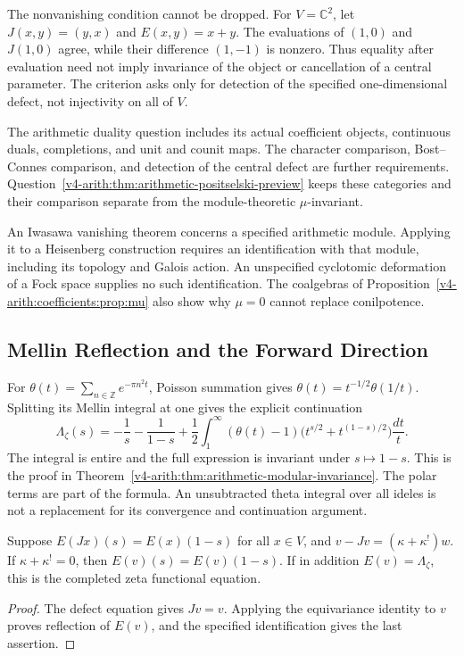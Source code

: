 The nonvanishing condition cannot be dropped. For
\(V=\mathbb C^2\), let \(J(x,y)=(y,x)\) and \(E(x,y)=x+y\).
The evaluations of \((1,0)\) and \(J(1,0)\) agree, while their
difference \((1,-1)\) is nonzero. Thus equality after evaluation
need not imply invariance of the object or cancellation of a central
parameter. The criterion asks only for detection of the specified
one-dimensional defect, not injectivity on all of \(V\).

\begin{remark}
\label{v4-arith:cl:rem:P1-conditional}
The arithmetic duality question includes its actual coefficient
objects, continuous duals, completions, and unit and counit maps.
The character comparison, Bost--Connes comparison, and detection of
the central defect are further requirements.
Question~\ref{v4-arith:thm:arithmetic-positselski-preview} keeps
these categories and their comparison separate from the
module-theoretic \(\mu\)-invariant.

An Iwasawa vanishing theorem concerns a specified arithmetic module.
Applying it to a Heisenberg construction requires an identification
with that module, including its topology and Galois action.
An unspecified cyclotomic deformation of a Fock space supplies no
such identification. The coalgebras of
Proposition~\ref{v4-arith:coefficients:prop:mu} also show why
\(\mu=0\) cannot replace conilpotence.
\end{remark}

\subsection{Mellin Reflection and the Forward Direction}

For \(\theta(t)=\sum_{n\in\mathbb Z}e^{-\pi n^2t}\), Poisson
summation gives \(\theta(t)=t^{-1/2}\theta(1/t)\). Splitting its
Mellin integral at one gives the explicit continuation
\begin{equation}
 \Lambda_\zeta(s)=-\frac1s-\frac1{1-s}
 +\frac12\int_1^\infty(\theta(t)-1)
       \bigl(t^{s/2}+t^{(1-s)/2}\bigr)\frac{dt}{t}.
\end{equation}
The integral is entire and the full expression is invariant under
\(s\mapsto1-s\). This is the proof in
Theorem~\ref{v4-arith:thm:arithmetic-modular-invariance}.
The polar terms are part of the formula. An unsubtracted theta
integral over all ideles is not a replacement for its convergence
and continuation argument.

\begin{corollary}
\label{v4-arith:cl:cor:P1-unconditional-forward}
Suppose \(E(Jx)(s)=E(x)(1-s)\) for all \(x\in V\), and
\(v-Jv=(\kappa+\kappa^!)w\). If \(\kappa+\kappa^!=0\), then
\(E(v)(s)=E(v)(1-s)\). If in addition \(E(v)=\Lambda_\zeta\),
this is the completed zeta functional equation.
\end{corollary}
\begin{proof}
The defect equation gives \(Jv=v\). Applying the equivariance
identity to \(v\) proves reflection of \(E(v)\), and the specified
identification gives the last assertion.
\end{proof}

